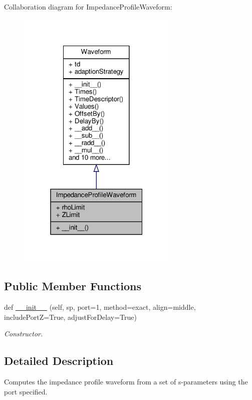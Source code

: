 Collaboration diagram for Impedance\+Profile\+Waveform\+:\nopagebreak
\begin{figure}[H]
\begin{center}
\leavevmode
\includegraphics[width=217pt]{classSignalIntegrity_1_1ImpedanceProfile_1_1ImpedanceProfileWaveform_1_1ImpedanceProfileWaveform__coll__graph}
\end{center}
\end{figure}
\subsection*{Public Member Functions}
\begin{DoxyCompactItemize}
\item 
def \hyperlink{classSignalIntegrity_1_1ImpedanceProfile_1_1ImpedanceProfileWaveform_1_1ImpedanceProfileWaveform_a44c18ce4afb30f11f4cdb07bc0f0c6be}{\+\_\+\+\_\+init\+\_\+\+\_\+} (self, sp, port=1, method=\textquotesingle{}exact\textquotesingle{}, align=\textquotesingle{}middle\textquotesingle{}, include\+PortZ=True, adjust\+For\+Delay=True)
\begin{DoxyCompactList}\small\item\em Constructor. \end{DoxyCompactList}\end{DoxyCompactItemize}


\subsection{Detailed Description}
Computes the impedance profile waveform from a set of s-\/parameters using the port specified. 

